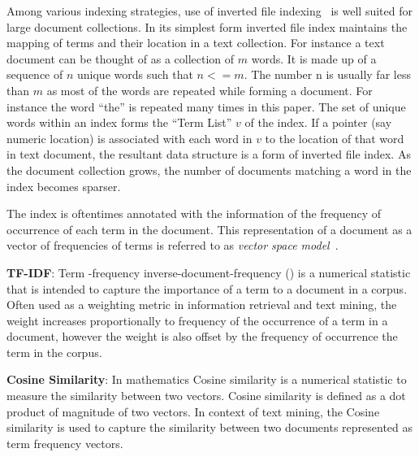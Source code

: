 Among various indexing strategies,
use of inverted file indexing~\cite{frakes1992introduction} is well suited for large
document collections. In its simplest form inverted file index maintains the
mapping of terms and their location in a text collection. For
instance a text document can be thought of as a collection
of $m$ words. It is made up of a sequence of $n$ unique words
such that $n <= m$. The number n is usually far less than
$m$ as most of the words are repeated while forming a document. 
For instance the word ``the'' is repeated many times in
this paper. The set of unique words within an index forms
the ``Term List'' $v$ of the index. If a pointer (say numeric
location) is associated with each word in $v$ to the location
of that word in text document, the resultant data structure
is a form of inverted file index. As the document collection
grows, the number of documents matching a word in the
index becomes sparser.

The index is oftentimes annotated with the information of the frequency of
occurrence of each term in the document. This representation of a document
as a vector of frequencies of terms is referred to as \textit{vector space model}~\cite{singhal2001modern,frakes1992introduction}.

\textbf{TF-IDF}\cite{manning2008introduction}: Term -frequency inverse-document-frequency () is a numerical statistic that is intended to capture the importance of a term to a document in a corpus.
Often used as a weighting metric in information retrieval and text mining,
the  weight increases proportionally to frequency of the occurrence of a term in a document, however the weight is also offset by the frequency of occurrence the term in the corpus.

\textbf{Cosine Similarity}\cite{singhal2001modern}: In mathematics Cosine similarity is a numerical statistic to measure the similarity between two vectors.
Cosine similarity is defined as a dot product of magnitude of two vectors.
In context of text mining, the Cosine similarity is used to capture the similarity between two documents represented as term frequency vectors.

